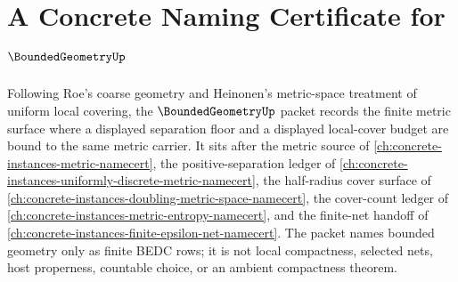 \chapter{A Concrete Naming Certificate for $\BoundedGeometryUp$}
\label{ch:concrete-instances-bounded-geometry-namecert}

Following Roe's coarse geometry and Heinonen's metric-space treatment of uniform local covering, the $\BoundedGeometryUp$ packet records the finite metric surface where a displayed separation floor and a displayed local-cover budget are bound to the same metric carrier. It sits after the metric source of \autoref{ch:concrete-instances-metric-namecert}, the positive-separation ledger of \autoref{ch:concrete-instances-uniformly-discrete-metric-namecert}, the half-radius cover surface of \autoref{ch:concrete-instances-doubling-metric-space-namecert}, the cover-count ledger of \autoref{ch:concrete-instances-metric-entropy-namecert}, and the finite-net handoff of \autoref{ch:concrete-instances-finite-epsilon-net-namecert}. The packet names bounded geometry only as finite BEDC rows; it is not local compactness, selected nets, host properness, countable choice, or an ambient compactness theorem.

